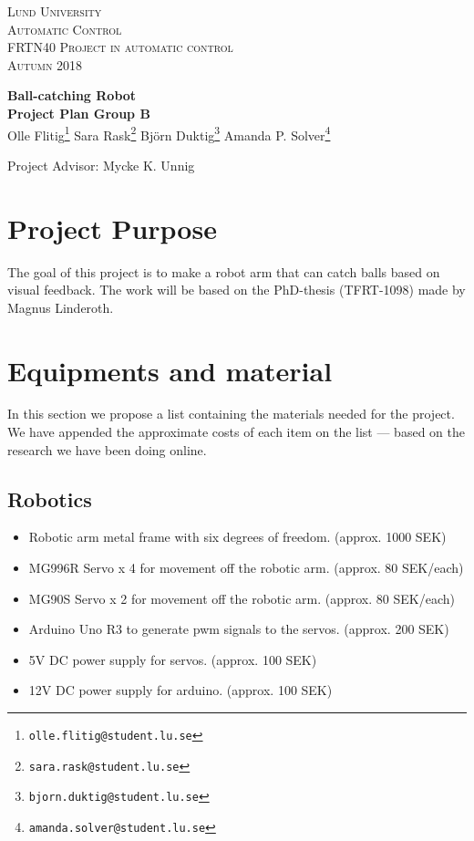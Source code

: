 \documentclass{article}
\begin{document}
\begin{titlepage}
  \begin{flushleft}\scshape
    Lund University\\
    Automatic Control\\[\smallskipamount]
    FRTN40 Project in automatic control\\
    Autumn 2018
  \end{flushleft}
  \vspace*{0pt plus 0.3fill}
  \begin{center}
    \huge \textbf{Ball-catching Robot}\\[4mm]     
    \large\textbf{Project Plan Group B}\\[5mm]
         Olle Flitig\footnote{\texttt{olle.flitig@student.lu.se}}\quad
         Sara Rask\footnote{\texttt{sara.rask@student.lu.se}}\quad
         Björn Duktig\footnote{\texttt{bjorn.duktig@student.lu.se}}\quad
         Amanda P. Solver\footnote{\texttt{amanda.solver@student.lu.se}}
  \end{center}
\begin{center}
    Project Advisor: Mycke K. Unnig
\end{center}
\vfill
\end{titlepage}        

\section{Project Purpose}
The goal of this project is to make a robot arm that can catch balls based on visual feedback. The work will be based on the PhD-thesis (TFRT-1098) made by Magnus Linderoth.

\section{Equipments and material} \label{sec:equipment}
In this section we propose a list containing the materials needed for the project. We have appended the approximate costs of each item on the list --- based on the research we have been doing online.
\subsection{Robotics}
    \begin{itemize}
        \item Robotic arm metal frame with six degrees of freedom. (approx. 1000 SEK)
        \item MG996R Servo x 4 for movement off the robotic arm. (approx. 80 SEK/each)
        \item MG90S Servo x 2 for movement off the robotic arm. (approx. 80 SEK/each)
        \item Arduino Uno R3 to generate pwm signals to the servos. (approx. 200 SEK)
        \item 5V DC power supply for servos. (approx. 100 SEK)
        \item 12V DC power supply for arduino. (approx. 100 SEK)
    \end{itemize}
\end{document}
